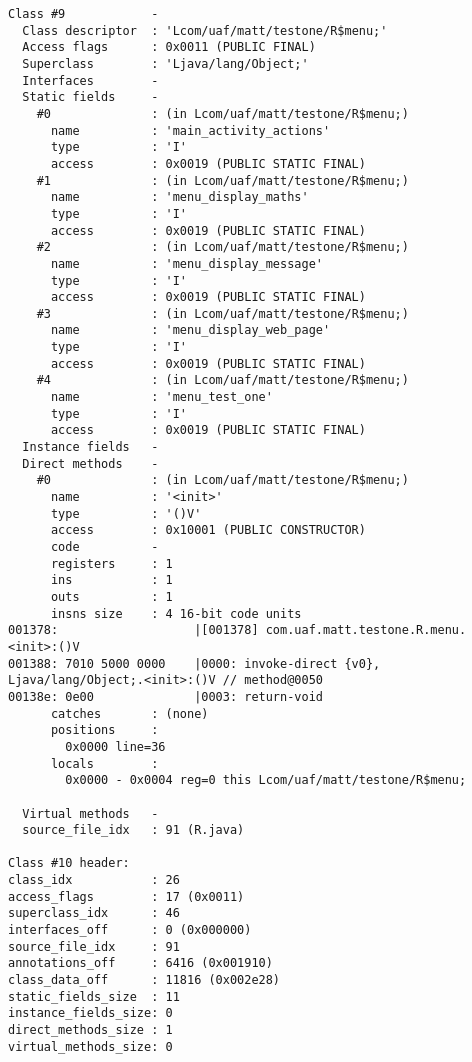 \begin{lstlisting}
Class #9            -
  Class descriptor  : 'Lcom/uaf/matt/testone/R$menu;'
  Access flags      : 0x0011 (PUBLIC FINAL)
  Superclass        : 'Ljava/lang/Object;'
  Interfaces        -
  Static fields     -
    #0              : (in Lcom/uaf/matt/testone/R$menu;)
      name          : 'main_activity_actions'
      type          : 'I'
      access        : 0x0019 (PUBLIC STATIC FINAL)
    #1              : (in Lcom/uaf/matt/testone/R$menu;)
      name          : 'menu_display_maths'
      type          : 'I'
      access        : 0x0019 (PUBLIC STATIC FINAL)
    #2              : (in Lcom/uaf/matt/testone/R$menu;)
      name          : 'menu_display_message'
      type          : 'I'
      access        : 0x0019 (PUBLIC STATIC FINAL)
    #3              : (in Lcom/uaf/matt/testone/R$menu;)
      name          : 'menu_display_web_page'
      type          : 'I'
      access        : 0x0019 (PUBLIC STATIC FINAL)
    #4              : (in Lcom/uaf/matt/testone/R$menu;)
      name          : 'menu_test_one'
      type          : 'I'
      access        : 0x0019 (PUBLIC STATIC FINAL)
  Instance fields   -
  Direct methods    -
    #0              : (in Lcom/uaf/matt/testone/R$menu;)
      name          : '<init>'
      type          : '()V'
      access        : 0x10001 (PUBLIC CONSTRUCTOR)
      code          -
      registers     : 1
      ins           : 1
      outs          : 1
      insns size    : 4 16-bit code units
001378:                   |[001378] com.uaf.matt.testone.R.menu.<init>:()V
001388: 7010 5000 0000    |0000: invoke-direct {v0}, Ljava/lang/Object;.<init>:()V // method@0050
00138e: 0e00              |0003: return-void
      catches       : (none)
      positions     :
        0x0000 line=36
      locals        :
        0x0000 - 0x0004 reg=0 this Lcom/uaf/matt/testone/R$menu;

  Virtual methods   -
  source_file_idx   : 91 (R.java)

Class #10 header:
class_idx           : 26
access_flags        : 17 (0x0011)
superclass_idx      : 46
interfaces_off      : 0 (0x000000)
source_file_idx     : 91
annotations_off     : 6416 (0x001910)
class_data_off      : 11816 (0x002e28)
static_fields_size  : 11
instance_fields_size: 0
direct_methods_size : 1
virtual_methods_size: 0


\end{lstlisting}
